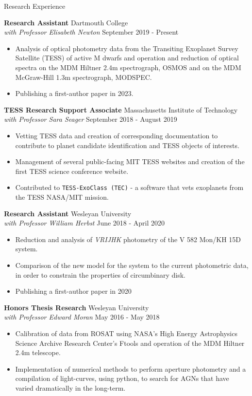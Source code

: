 \documentclass{resume} %
\begin{document}
\begin{rSection}{Research Experience}

{\bf Research Assistant}
{\hfill Dartmouth College} \\
{\sl with Professor Elisabeth Newton} \hfill September 2019 - Present
\begin{itemize} \itemsep -6pt
\item Analysis of optical photometry data from the Transiting Exoplanet Survey Satellite (TESS) of active M dwarfs and operation and reduction of optical spectra on the MDM Hiltner 2.4m spectrograph, OSMOS and on the MDM McGraw-Hill 1.3m spectrograph, MODSPEC.
\item Publishing a first-author paper in 2023.
\end{itemize}

{\bf TESS Research Support Associate}
{\hfill Massachusetts Institute of Technology} \\
{\sl with Professor Sara Seager} \hfill September 2018 - August 2019
\begin{itemize} \itemsep -6pt
\item Vetting TESS data and creation of corresponding documentation to contribute to planet candidate identification and TESS objects of interests. 
\item Management of several public-facing MIT TESS websites and creation of the first TESS science conference website.
\item Contributed to \texttt{TESS-ExoClass (TEC)} - a software that vets exoplanets from the TESS NASA/MIT mission.
\end{itemize}

{\bf Research Assistant}
{\hfill Wesleyan University} \\
{\sl with Professor William Herbst} \hfill June 2018 - April 2020
\begin{itemize} \itemsep -6pt
\item Reduction and analysis of \textit{VRIJHK} photometry of the V 582 Mon/KH 15D system.
\item Comparison of the new model for the system to the current photometric data, in order to constrain the properties of circumbinary disk.
\item Publishing a first-author paper in 2020
\end{itemize}

{\bf Honors Thesis Research} \hfill Wesleyan University  \\
{\sl with Professor Edward Moran} \hfill May 2016 - May 2018 
\begin{itemize} \itemsep -6pt %
\item Calibration of data from ROSAT using NASA's High Energy Astrophysics Science Archive Research Center's Ftools and operation of the MDM Hiltner 2.4m telescope.
\item Implementation of numerical methods to perform aperture photometry and a compilation of light-curves, using python, to search for AGNs that have varied dramatically in the long-term.
\end{itemize}


\end{rSection}
\end{document}
